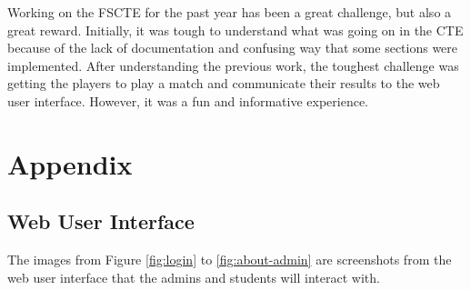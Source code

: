 \documentclass[a4paper, 11pt]{report}
\begin{document}
Working on the FSCTE for the past year has been a great challenge, but also a
great reward. Initially, it was tough to understand what was going on in the CTE
because of the lack of documentation and confusing way that some sections were
implemented. After understanding the previous work, the toughest challenge was
getting the players to play a match and communicate their results to the web
user interface. However, it was a fun and informative experience.

\chapter{Appendix}

\section{Web User Interface}

The images from Figure \ref{fig:login} to \ref{fig:about-admin} are screenshots
from the web user interface that the admins and students will interact with.
\vspace{0.4cm}
\end{document}
